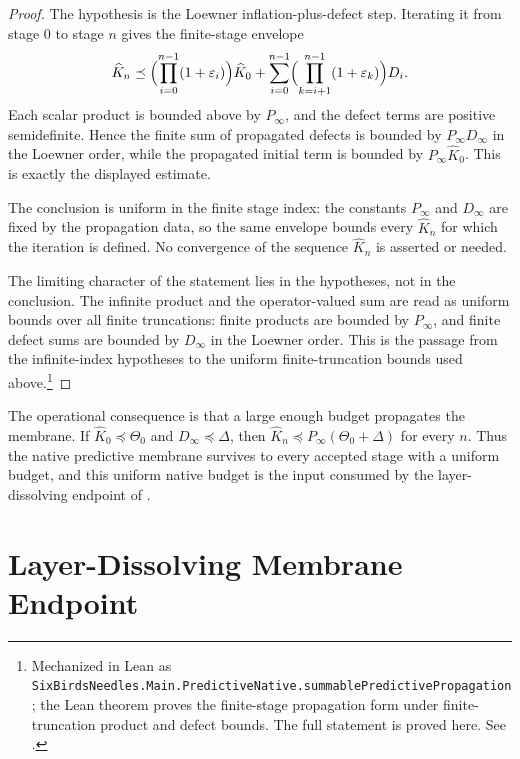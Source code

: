 \documentclass[11pt]{article}
\newcommand{\preceqq}{\preceq}
\theoremstyle{definition}
\begin{document}
\begin{proof}
The hypothesis is the Loewner inflation-plus-defect step.  Iterating it
from stage \(0\) to stage \(n\) gives the finite-stage envelope
\[
  \widehat K_n
  \preceqq
  \Bigl(\prod_{i=0}^{n-1}(1+\varepsilon_i)\Bigr)\widehat K_0
  +
  \sum_{i=0}^{n-1}
  \Bigl(\prod_{k=i+1}^{n-1}(1+\varepsilon_k)\Bigr)D_i .
\]
Each scalar product is bounded above by \(P_\infty\), and the defect
terms are positive semidefinite.  Hence the finite sum of propagated
defects is bounded by \(P_\infty D_\infty\) in the Loewner order, while
the propagated initial term is bounded by \(P_\infty\widehat K_0\).  This
is exactly the displayed estimate.

The conclusion is uniform in the finite stage index: the constants
\(P_\infty\) and \(D_\infty\) are fixed by the propagation data, so the
same envelope bounds every \(\widehat K_n\) for which the iteration is
defined.  No convergence of the sequence \(\widehat K_n\) is asserted or
needed.

The limiting character of the statement lies in the hypotheses, not in
the conclusion.  The infinite product and the operator-valued sum are
read as uniform bounds over all finite truncations: finite products are
bounded by \(P_\infty\), and finite defect sums are bounded by
\(D_\infty\) in the Loewner order.  This is the passage from the
infinite-index hypotheses to the uniform finite-truncation bounds used
above.\footnote{Mechanized in Lean as
\texttt{SixBirdsNeedles.Main.PredictiveNative.summablePredictivePropagation};
the Lean theorem proves the finite-stage propagation form under
finite-truncation product and defect bounds.  The full statement is
proved here.  See .}
\end{proof}

The operational consequence is that a large enough budget propagates the
membrane.  If \(\widehat K_0\preceqq\Theta_0\) and
\(D_\infty\preceqq\Delta\), then
\(\widehat K_n\preceqq P_\infty(\Theta_0+\Delta)\) for every \(n\).  Thus
the native predictive membrane survives to every accepted stage with a
uniform budget, and this uniform native budget is the input consumed by the
layer-dissolving endpoint of .

 

\section{Layer-Dissolving Membrane Endpoint}
\label{sec:dissolution}
\end{document}

